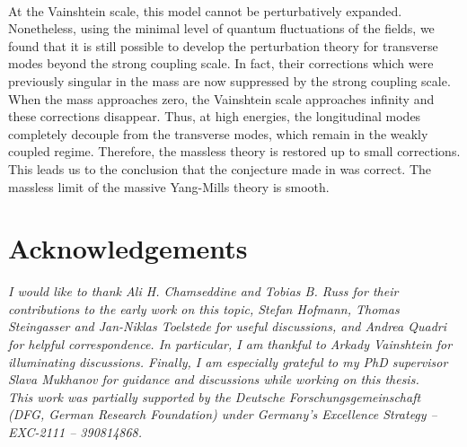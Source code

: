 \documentclass{article}
\begin{document}
\\
At the Vainshtein scale, this model cannot be perturbatively expanded. Nonetheless, using the minimal level of quantum fluctuations of the fields, we found that it is still possible to develop the perturbation theory for transverse modes beyond the strong coupling scale. In fact, their corrections which were previously singular in the mass are now suppressed by the strong coupling scale. When the mass approaches zero, the Vainshtein scale approaches infinity and these corrections disappear. Thus, at high energies, the longitudinal modes completely decouple from the transverse modes, which remain in the weakly coupled regime. Therefore, the massless theory is restored up to small corrections. This leads us to the conclusion that the conjecture made in \cite{Vainshtein} was correct. The massless limit of the massive Yang-Mills theory is smooth. 


\section*{Acknowledgements}
 \textit{ I would like to thank Ali H. Chamseddine and Tobias B. Russ for their contributions to the early work on this topic, Stefan Hofmann, Thomas Steingasser and Jan-Niklas Toelstede for useful discussions, and Andrea Quadri for helpful correspondence. In particular, I am thankful to Arkady Vainshtein for illuminating discussions. Finally, I am especially grateful to my PhD supervisor Slava Mukhanov for guidance and discussions while working on this thesis. \\This work was partially supported by the Deutsche Forschungsgemeinschaft
(DFG, German Research Foundation) under Germany’s Excellence Strategy – EXC-2111 – 390814868.}


\newpage
\end{document}
